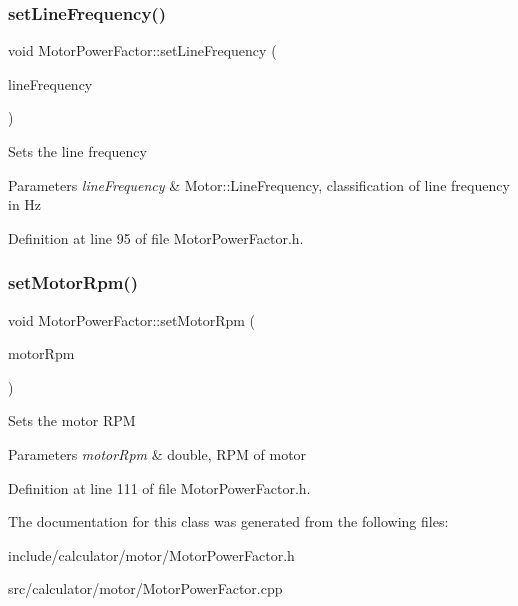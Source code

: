 \subsubsection{\texorpdfstring{set\+Line\+Frequency()}{setLineFrequency()}}
{\footnotesize\ttfamily void Motor\+Power\+Factor\+::set\+Line\+Frequency (\begin{DoxyParamCaption}\item[{Motor\+::\+Line\+Frequency}]{line\+Frequency }\end{DoxyParamCaption})\hspace{0.3cm}{\ttfamily [inline]}}

Sets the line frequency 
\begin{DoxyParams}{Parameters}
{\em line\+Frequency} & Motor\+::\+Line\+Frequency, classification of line frequency in Hz \\
\hline
\end{DoxyParams}


Definition at line 95 of file Motor\+Power\+Factor.\+h.

\mbox{\label{class_motor_power_factor_a4154bf52c6c9c9e5fb2f0985d7ae3531}} 
\subsubsection{\texorpdfstring{set\+Motor\+Rpm()}{setMotorRpm()}}
{\footnotesize\ttfamily void Motor\+Power\+Factor\+::set\+Motor\+Rpm (\begin{DoxyParamCaption}\item[{double}]{motor\+Rpm }\end{DoxyParamCaption})\hspace{0.3cm}{\ttfamily [inline]}}

Sets the motor R\+PM 
\begin{DoxyParams}{Parameters}
{\em motor\+Rpm} & double, R\+PM of motor \\
\hline
\end{DoxyParams}


Definition at line 111 of file Motor\+Power\+Factor.\+h.



The documentation for this class was generated from the following files\+:\begin{DoxyCompactItemize}
\item 
include/calculator/motor/Motor\+Power\+Factor.\+h\item 
src/calculator/motor/Motor\+Power\+Factor.\+cpp\end{DoxyCompactItemize}
